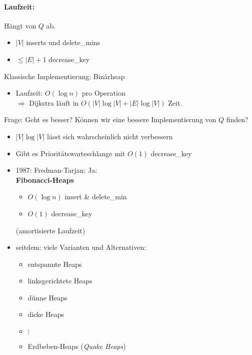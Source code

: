 \paragraph*{Laufzeit:} Hängt von $Q$ ab.
\begin{itemize}
 \item $|V|$ inserts und delete\_mins
 \item $\leq |E| + 1$ decrease\_key 
\end{itemize}
Klassische Implementierung: Binärheap
\begin{itemize}
\item   Laufzeit: $O(\log n)$ pro Operation\\
        $\Rightarrow$ Dijkstra läuft in $O(|V|  \log |V| + |E| \log |V|)$ Zeit.
\end{itemize}
Frage: Geht es besser? Können wir eine bessere Implementierung von $Q$ finden?
\begin{itemize}
 \item $|V| \log |V|$ lässt sich wahrscheinlich nicht verbessern
 \item Gibt es Prioritätswarteschlange mit $O(1)$ decrease\_key
 \item 1987: Fredman-Tarjan: Ja: \\
     \textbf{Fibonacci-Heaps}
         \begin{itemize}
          \item $O(\log n)$ insert \& delete\_min
          \item $O(1)$ decrease\_key
         \end{itemize}
        (amortisierte Laufzeit)
 \item seitdem: viele Varianten und Alternativen:
     \begin{itemize}
     \item entspannte Heaps
     \item linksgerichtete Heaps
     \item dünne Heaps
     \item dicke Heaps
     \item $\vdots$
     \item Erdbeben-Heaps (\emph{Quake Heaps})
     \end{itemize}
\end{itemize}
